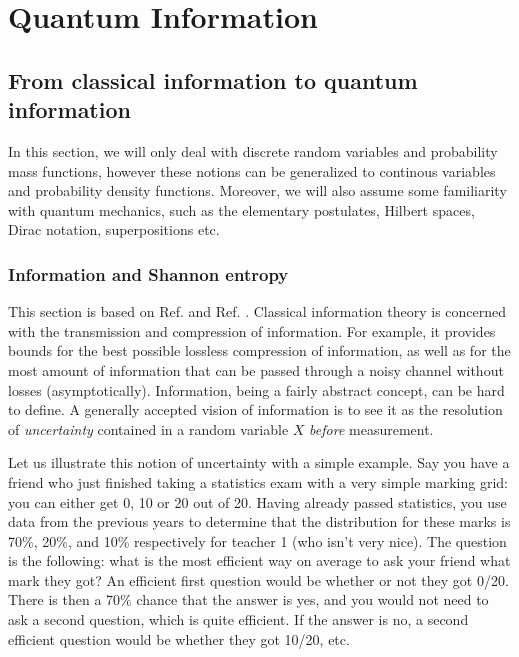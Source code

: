 \chapter{Quantum Information}

\section{From classical information to quantum information} \label{sec:classical_information}

In this section, we will only deal with discrete random variables and probability mass functions, however these notions can be generalized to continous variables and probability density functions. Moreover, we will also assume some familiarity with quantum mechanics, such as the elementary postulates, Hilbert spaces, Dirac notation, superpositions etc.

\subsection{Information and Shannon entropy}

This section is based on Ref. \cite[pp. 1-56]{cover_elements_2006} and Ref. \cite[pp. 500-506]{nielsen_quantum_2010}. Classical information theory is concerned with the transmission and compression of information. For example, it provides bounds for the best possible lossless compression of information, as well as for the most amount of information that can be passed through a noisy channel without losses (asymptotically). Information, being a fairly abstract concept, can be hard to define. A generally accepted vision of information is to see it as the resolution of \textit{uncertainty} contained in a random variable $X$ \textit{before} measurement.

Let us illustrate this notion of uncertainty with a simple example. Say you have a friend who just finished taking a statistics exam with a very simple marking grid: you can either get 0, 10 or 20 out of 20. Having already passed statistics, you use data from the previous years to determine that the distribution for these marks is 70\%, 20\%, and 10\% respectively for teacher 1 (who isn't very nice). The question is the following: what is the most efficient way on average to ask your friend what mark they got? An efficient first question would be whether or not they got 0/20. There is then a 70\% chance that the answer is yes, and you would not need to ask a second question, which is quite efficient. If the answer is no, a second efficient question would be whether they got 10/20, etc.

